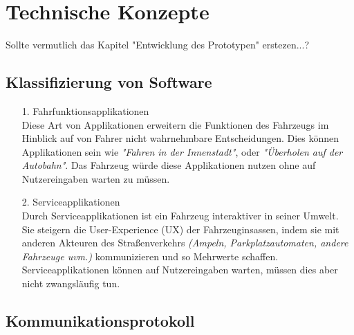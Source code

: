 \section{Technische Konzepte}\label{technische_konzepte}
Sollte vermutlich das Kapitel "Entwicklung des Prototypen" erstezen...?\\

\subsection{Klassifizierung von Software}

\begin{itemize}
	\item[1.] Fahrfunktionsapplikationen\\
	Diese Art von Applikationen erweitern die Funktionen des Fahrzeugs im Hinblick auf von Fahrer nicht wahrnehmbare Entscheidungen. Dies können Applikationen sein wie \textit{"Fahren in der Innenstadt"}, oder \textit{"Überholen auf der Autobahn"}. Das Fahrzeug würde diese Applikationen nutzen ohne auf Nutzereingaben warten zu müssen.
	
	\item[2.] Serviceapplikationen\\
	Durch Serviceapplikationen ist ein Fahrzeug interaktiver in seiner Umwelt. Sie steigern die User-Experience (UX) der Fahrzeuginsassen, indem sie mit anderen Akteuren des Straßenverkehrs \textit{(Ampeln, Parkplatzautomaten, andere Fahrzeuge uvm.)} kommunizieren und so Mehrwerte schaffen. Serviceapplikationen können auf Nutzereingaben warten, müssen dies aber nicht zwangsläufig tun.
\end{itemize}

\subsection{Kommunikationsprotokoll}